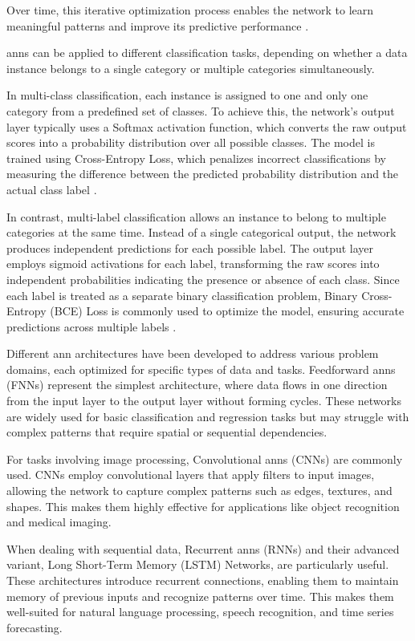 Over time, this iterative optimization process enables the network to learn meaningful patterns and improve its predictive performance \cite{goodfellow2016deep}.

\ac{ann}s can be applied to different classification tasks, depending on whether a data instance belongs to a single category or multiple categories simultaneously.

In multi-class classification, each instance is assigned to one and only one category from a predefined set of classes.
To achieve this, the network's output layer typically uses a Softmax activation function, which converts the raw output scores into a probability distribution over all possible classes.
The model is trained using Cross-Entropy Loss, which penalizes incorrect classifications by measuring the difference between the predicted probability distribution and the actual class label \cite{bishop2006pattern}.

In contrast, multi-label classification allows an instance to belong to multiple categories at the same time.
Instead of a single categorical output, the network produces independent predictions for each possible label.
The output layer employs sigmoid activations for each label, transforming the raw scores into independent probabilities indicating the presence or absence of each class.
Since each label is treated as a separate binary classification problem, Binary Cross-Entropy (BCE) Loss is commonly used to optimize the model, ensuring accurate predictions across multiple labels \cite{zhang2018binary}.

Different \ac{ann} architectures have been developed to address various problem domains, each optimized for specific types of data and tasks.
Feedforward \ac{ann}s (FNNs) represent the simplest architecture, where data flows in one direction from the input layer to the output layer without forming cycles.
These networks are widely used for basic classification and regression tasks but may struggle with complex patterns that require spatial or sequential dependencies.

For tasks involving image processing, Convolutional \ac{ann}s (CNNs) are commonly used.
CNNs employ convolutional layers that apply filters to input images, allowing the network to capture complex patterns such as edges, textures, and shapes.
This makes them highly effective for applications like object recognition and medical imaging.

When dealing with sequential data, Recurrent \ac{ann}s (RNNs) and their advanced variant, Long Short-Term Memory (LSTM) Networks, are particularly useful.
These architectures introduce recurrent connections, enabling them to maintain memory of previous inputs and recognize patterns over time.
This makes them well-suited for natural language processing, speech recognition, and time series forecasting.

